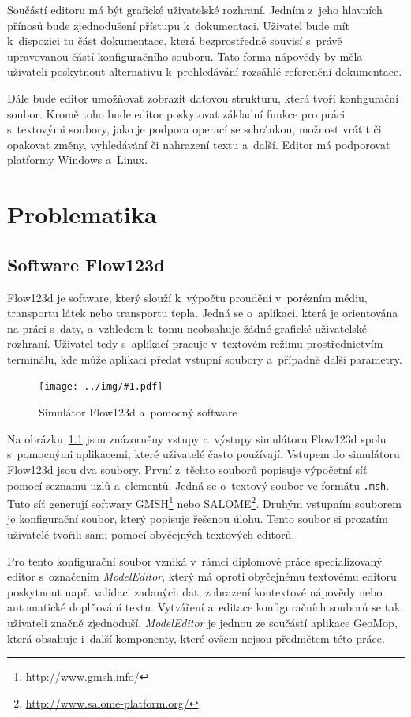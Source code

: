 \documentclass[FM,bw,DP]{tulthesis}
\newcommand{\includeimg}[2]{%
\begin{figure}[h]
	\centering
    \texttt{[image: ../img/\#1.pdf]}
    \caption{#2}
	\label{img:#1}
\end{figure}
}
\begin{document}
Součástí editoru má být grafické uživatelské rozhraní. Jedním z~jeho hlavních přínosů bude zjednodušení přístupu k~dokumentaci. Uživatel bude mít k~dispozici tu část dokumentace, která bezprostředně souvisí s~právě upravovanou částí konfiguračního souboru. Tato forma nápovědy by měla uživateli poskytnout alternativu k~prohledávání rozsáhlé referenční dokumentace.

Dále bude editor umožňovat zobrazit datovou strukturu, která tvoří konfigurační soubor. Kromě toho bude editor poskytovat základní funkce pro práci s~textovými soubory, jako je podpora operací se schránkou, možnost vrátit či opakovat změny, vyhledávání či nahrazení textu a~další. Editor má podporovat platformy Windows a~Linux.



\chapter{Problematika}

\section{Software Flow123d}

Flow123d je software, který slouží k~výpočtu proudění v~porézním médiu, transportu látek nebo transportu tepla. Jedná se o~aplikaci, která je orientována na práci s~daty, a~vzhledem k~tomu neobsahuje žádné grafické uživatelské rozhraní. Uživatel tedy s~aplikací pracuje v~textovém režimu prostřednictvím terminálu, kde může aplikaci předat vstupní soubory a~případně další parametry.

\includeimg{flow123d}{Simulátor Flow123d a~pomocný software}

Na obrázku~\ref{img:flow123d} jsou znázorněny vstupy a~výstupy simulátoru Flow123d spolu s~pomocnými aplikacemi, které uživatelé často používají. Vstupem do simulátoru Flow123d jsou dva soubory. První z~těchto souborů popisuje výpočetní síť pomocí seznamu uzlů a~elementů. Jedná se o~textový soubor ve formátu \texttt{.msh}. Tuto síť generují softwary GMSH\footnote{\url{http://www.gmsh.info/}} nebo SALOME\footnote{\url{http://www.salome-platform.org/}}. Druhým vstupním souborem je konfigurační soubor, který popisuje řešenou úlohu. Tento soubor si prozatím uživatelé tvořili sami pomocí obyčejných textových editorů.

Pro tento konfigurační soubor vzniká v~rámci diplomové práce specializovaný editor s~označením \textit{ModelEditor}, který má oproti obyčejnému textovému editoru poskytnout např. validaci zadaných dat, zobrazení kontextové nápovědy nebo automatické doplňování textu. Vytváření a~editace konfiguračních souborů se tak uživateli značně zjednoduší. \textit{ModelEditor} je jednou ze součástí aplikace GeoMop, která obsahuje i~další komponenty, které ovšem nejsou předmětem této práce.
\end{document}
